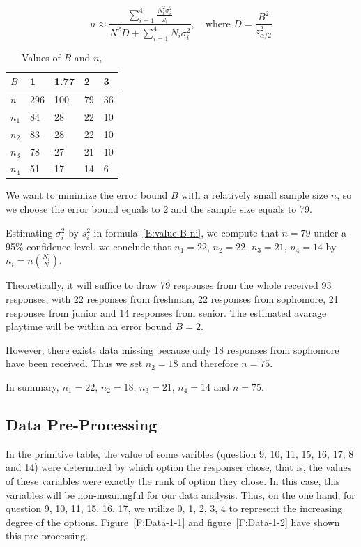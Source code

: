 \documentclass[scheme=plain]{ctexart}
\begin{document}
\begin{equation}\label{E:value-B-ni}
    n\approx\frac{\sum_{i=1}^4\frac{N_i^2\sigma_i^2}{\omega_i}}{N^2D+\sum_{i=1}^4N_i\sigma_i^2},\quad\text{where $D=\frac{B^2}{z_{\alpha/2}^2}$}
\end{equation}

\begin{table}[htbp]
    \centering
    \begin{tabular}{|l|l|l|l|l|}
        \hline
        $B$   & 1   & 1.77 & 2  & 3  \\ \hline
        $n$   & 296 & 100  & 79 & 36 \\ \hline
        $n_1$ & 84  & 28   & 22 & 10 \\ \hline
        $n_2$ & 83  & 28   & 22 & 10 \\ \hline
        $n_3$ & 78  & 27   & 21 & 10 \\ \hline
        $n_4$ & 51  & 17   & 14 & 6  \\ \hline
    \end{tabular}
    \caption{Values of $B$ and $n_i$}\label{T:value-B-ni}
\end{table}

We want to minimize the error bound $B$ with a relatively small sample size $n$, so we choose the error bound equals to 2 and the sample size equals to 79.

Estimating $\sigma_i^2$ by $s_i^2$ in formula~\eqref{E:value-B-ni}, we compute that $n=79$ under a 95\% confidence level. we conclude that $n_1=22$, $n_2=22$, $n_3=21$, $n_4=14$ by $n_i=n\left(\frac{N_i}{N}\right)$.

Theoretically, it will suffice to draw 79 responses from the whole received 93 responses, with 22 responses from freshman, 22 responses from sophomore, 21 responses from junior and 14 responses from senior. The estimated avarage playtime will be within an error bound $B=2$.

However, there exists data missing because only 18 responses from sophomore have been received. Thus we set $n_2=18$ and therefore $n=75$.

In summary, $n_1=22$, $n_2=18$, $n_3=21$, $n_4=14$ and $n=75$.


\subsection{Data Pre-Processing}
In the primitive table, the value of some varibles (question 9, 10, 11, 15, 16, 17, 8 and 14) were determined by which option the responser chose, that is, the values of these variables were exactly the rank of option they chose. In this case, this variables will be non-meaningful for our data analysis.
Thus, on the one hand, for question 9, 10, 11, 15, 16, 17, we utilize 0, 1, 2, 3, 4 to represent the increasing degree of the options. Figure~\ref{F:Data-1-1} and figure~\ref{F:Data-1-2} have shown this pre-processing.
\end{document}
